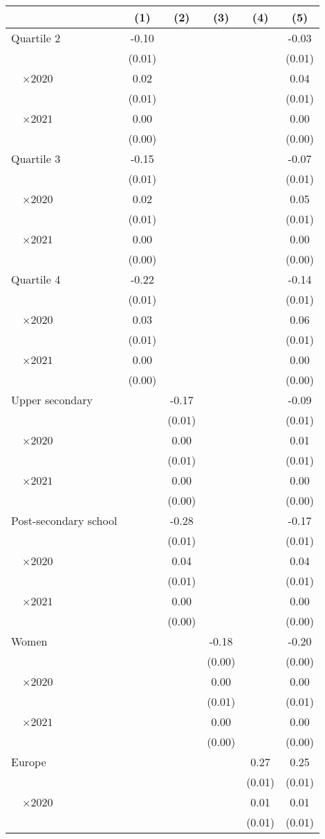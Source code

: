 
\begin{tabular}{@{}l*{5}{S[table-format={-}2.2{\tnote{***}}]}@{}}
\toprule
{} & {(1)} & {(2)} & {(3)} & {(4)} & {(5)}\tabularnewline%
\midrule
Quartile 2 & -0.10\tnote{***} &  &  &  & -0.03\tnote{***}\tabularnewline%
 & (0.01) &  &  &  & \vphantom{5} (0.01)\tabularnewline%
~~\(\times 2020\) & 0.02\tnote{\dagger} &  &  &  & 0.04\tnote{***}\tabularnewline%
 & (0.01) &  &  &  & \vphantom{4} (0.01)\tabularnewline%
~~\(\times 2021\) & 0.00 &  &  &  & \vphantom{2} 0.00\tabularnewline%
 & (0.00) &  &  &  & \vphantom{2} (0.00)\tabularnewline%
Quartile 3 & -0.15\tnote{***} &  &  &  & -0.07\tnote{***}\tabularnewline%
 & (0.01) &  &  &  & \vphantom{3} (0.01)\tabularnewline%
~~\(\times 2020\) & 0.02\tnote{\dagger} &  &  &  & 0.05\tnote{***}\tabularnewline%
 & (0.01) &  &  &  & \vphantom{2} (0.01)\tabularnewline%
~~\(\times 2021\) & 0.00 &  &  &  & \vphantom{1} 0.00\tabularnewline%
 & (0.00) &  &  &  & \vphantom{1} (0.00)\tabularnewline%
Quartile 4 & -0.22\tnote{***} &  &  &  & -0.14\tnote{***}\tabularnewline%
 & (0.01) &  &  &  & \vphantom{1} (0.01)\tabularnewline%
~~\(\times 2020\) & 0.03\tnote{***} &  &  &  & 0.06\tnote{***}\tabularnewline%
 & (0.01) &  &  &  & (0.01)\tabularnewline%
~~\(\times 2021\) & 0.00 &  &  &  & 0.00\tabularnewline%
 & (0.00) &  &  &  & (0.00)\tabularnewline%
Upper secondary &  & -0.17\tnote{***} &  &  & -0.09\tnote{***}\tabularnewline%
 &  & (0.01) &  &  & \vphantom{3} (0.01)\tabularnewline%
~~\(\times 2020\) &  & 0.00 &  &  & 0.01\tabularnewline%
 &  & (0.01) &  &  & \vphantom{2} (0.01)\tabularnewline%
~~\(\times 2021\) &  & 0.00 &  &  & \vphantom{1} 0.00\tabularnewline%
 &  & (0.00) &  &  & \vphantom{1} (0.00)\tabularnewline%
Post-secondary school &  & -0.28\tnote{***} &  &  & -0.17\tnote{***}\tabularnewline%
 &  & (0.01) &  &  & \vphantom{1} (0.01)\tabularnewline%
~~\(\times 2020\) &  & 0.04\tnote{***} &  &  & 0.04\tnote{**}\tabularnewline%
 &  & (0.01) &  &  & (0.01)\tabularnewline%
~~\(\times 2021\) &  & 0.00 &  &  & 0.00\tabularnewline%
 &  & (0.00) &  &  & (0.00)\tabularnewline%
Women &  &  & -0.18\tnote{***} &  & -0.20\tnote{***}\tabularnewline%
 &  &  & (0.00) &  & \vphantom{1} (0.00)\tabularnewline%
~~\(\times 2020\) &  &  & 0.00 &  & 0.00\tabularnewline%
 &  &  & (0.01) &  & (0.01)\tabularnewline%
~~\(\times 2021\) &  &  & 0.00 &  & 0.00\tabularnewline%
 &  &  & (0.00) &  & (0.00)\tabularnewline%
Europe &  &  &  & 0.27\tnote{***} & 0.25\tnote{***}\tabularnewline%
 &  &  &  & (0.01) & \vphantom{3} (0.01)\tabularnewline%
~~\(\times 2020\) &  &  &  & 0.01 & 0.01\tabularnewline%
 &  &  &  & (0.01) & \vphantom{2} (0.01)\tabularnewline%

\end{tabular}
